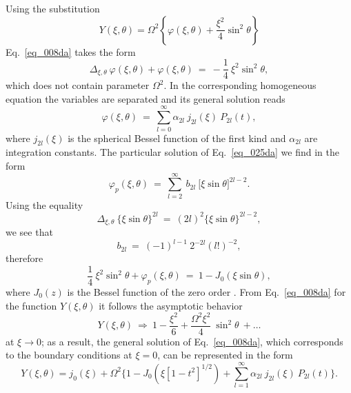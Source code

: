 \documentclass{caosp308}
\begin{document}
Using the substitution
\begin{equation}
\label{eq_024da}
Y(\xi,\theta)=\Omega^2\left\{\varphi(\xi,\theta)+\frac{\xi^2}{4}\sin^2\theta\right\}
\end{equation}
Eq.~\eqref{eq_008da} takes the form
\begin{equation}
\label{eq_025da}
\Delta_{\xi,\theta}\:\varphi (\xi,\theta)+\varphi(\xi,\theta)\:=\:-\frac{1}{4}\:\xi^2\sin^2\theta,
\end{equation}
which does not contain parameter $\Omega^2$. In the corresponding homogeneous equation the variables are separated and its general solution reads
\begin{equation}
\label{eq_026da}
\varphi(\xi,\theta)\:=\:\sum^{\infty}_{l=0}\alpha_{2l}\:j_{2l}(\xi)\:P_{2l}(t),
\end{equation}
where $j_{2l} (\xi)$ is the spherical Bessel function of the first kind \citep*{1970hmfw.book.....A} and $\alpha_{2l}$ are integration constants. The particular solution of  Eq.~\eqref{eq_025da} we find in the form
\begin{equation}
\label{eq_027da}
\varphi_{p}(\xi, \theta)\:=\:\sum^{\infty}_{l=2}\:b_{2l}\:\bigl[\xi \sin \theta\bigr]^{2l-2}.
\end{equation}
Using the equality
\begin{equation}
\label{eq_028da}
\Delta_{\xi, \theta}\:\{\xi\sin \theta\}^{2l} \:=\:(2l)^2 \{\xi \sin \theta\}^{2l-2},
\end{equation}
we see that
\begin{equation}
\label{eq_029da}
b_{2l}\:=\:(-1)^{l-1} \:2^{-2l} (l!)^{-2},
\end{equation}
therefore
\begin{equation}
\label{eq_030da}
\frac14\:\xi^2 \sin^2\theta+\varphi_{p}(\xi,\theta)\:=\:1-J_0(\xi \sin\theta),
\end{equation}
where $J_0 (z)$ is the Bessel function of the zero order \citep*{1970hmfw.book.....A}. From Eq.~\eqref{eq_008da} for the function $Y(\xi,\theta)$ it follows the asymptotic behavior
\begin{equation}
\label{eq_031da}
Y(\xi,\theta)\:\Rightarrow\:1-\frac{\xi^2}{6}+\frac{\Omega^2\xi^2}{4}\:\sin^2\theta\:+\ldots
\end{equation}
at $\xi\to 0$; as a result, the general solution of  Eq.~\eqref{eq_008da}, which corresponds to the boundary conditions at $\xi=0$, can be represented in the form
\begin{equation}
\label{eq_032da}
Y(\xi,\theta)=j_0(\xi)+\Omega^2\biggl\{1-J_0 (\xi[1-t^2]^{1/2})+\sum^{\infty}_{l=1}
\alpha_{2l}\:j_{2l}(\xi)\:P_{2l}(t)\biggr\}.
\end{equation}
\end{document}
